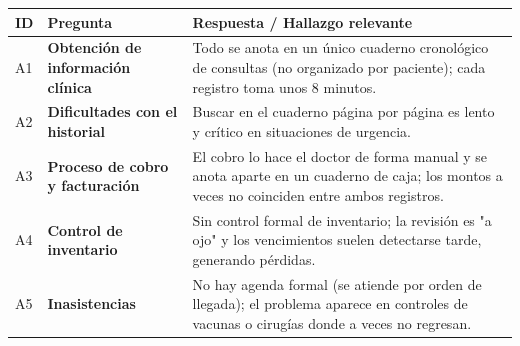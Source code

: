 \documentclass[
]{article}
\newcounter{none} %
\begin{document}
{\def\LTcaptype{none} %
\begin{longtable}[]{|
  >{\centering\arraybackslash}p{}|
  >{\raggedright\arraybackslash}p{}|
  >{\raggedright\arraybackslash}p{}|}
\hline
\begin{minipage}[b]{\linewidth}\centering
\textbf{ID}
\end{minipage} & \begin{minipage}[b]{\linewidth}\centering
\textbf{Pregunta}
\end{minipage} & \begin{minipage}[b]{\linewidth}\raggedright
\textbf{Respuesta / Hallazgo relevante}
\end{minipage} \\
\hline
\endhead
\hline
\endlastfoot
A1 & \textbf{Obtención de información clínica} &
\begin{minipage}[t]{\linewidth}\raggedright
Todo se anota en un único cuaderno cronológico de consultas (no organizado por paciente); cada registro toma unos 8 minutos.
\end{minipage} \\
\hline
A2 & \textbf{Dificultades con el historial} &
\begin{minipage}[t]{\linewidth}\raggedright
Buscar en el cuaderno página por página es lento y crítico en situaciones de urgencia.
\end{minipage} \\
\hline
A3 & \textbf{Proceso de cobro y facturación} &
\begin{minipage}[t]{\linewidth}\raggedright
El cobro lo hace el doctor de forma manual y se anota aparte en un cuaderno de caja; los montos a veces no coinciden entre ambos registros.
\end{minipage} \\
\hline
A4 & \textbf{Control de inventario} &
\begin{minipage}[t]{\linewidth}\raggedright
Sin control formal de inventario; la revisión es "a ojo" y los vencimientos suelen detectarse tarde, generando pérdidas.
\end{minipage} \\
\hline
A5 & \textbf{Inasistencias} &
\begin{minipage}[t]{\linewidth}\raggedright
No hay agenda formal (se atiende por orden de llegada); el problema aparece en controles de vacunas o cirugías donde a veces no regresan.
\end{minipage} \\

\end{longtable}}
\end{document}
